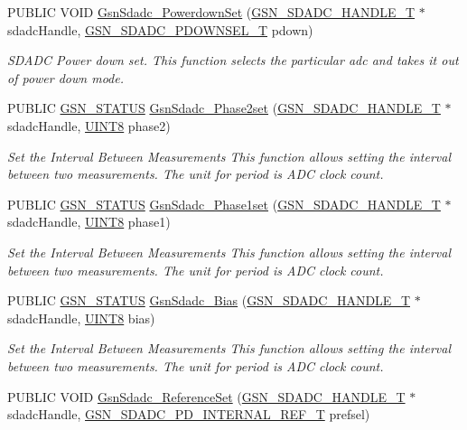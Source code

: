 \begin{DoxyCompactItemize}
PUBLIC VOID \hyperlink{a00652_ga8c97796c009f87dc85fea1d9903b5fe3}{GsnSdadc\_\-PowerdownSet} (\hyperlink{a00214}{GSN\_\-SDADC\_\-HANDLE\_\-T} $\ast$sdadcHandle, \hyperlink{a00652_gaa6002bca137b8b6b143379be96c9564b}{GSN\_\-SDADC\_\-PDOWNSEL\_\-T} pdown)
\begin{DoxyCompactList}\small\item\em SDADC Power down set. This function selects the particular adc and takes it out of power down mode. \end{DoxyCompactList}\item 
PUBLIC \hyperlink{a00660_gada5951904ac6110b1fa95e51a9ddc217}{GSN\_\-STATUS} \hyperlink{a00652_gab713a736854b758a0e5034cef7907731}{GsnSdadc\_\-Phase2set} (\hyperlink{a00214}{GSN\_\-SDADC\_\-HANDLE\_\-T} $\ast$sdadcHandle, \hyperlink{a00660_gab27e9918b538ce9d8ca692479b375b6a}{UINT8} phase2)
\begin{DoxyCompactList}\small\item\em Set the Interval Between Measurements This function allows setting the interval between two measurements. The unit for period is ADC clock count. \end{DoxyCompactList}\item 
PUBLIC \hyperlink{a00660_gada5951904ac6110b1fa95e51a9ddc217}{GSN\_\-STATUS} \hyperlink{a00652_gaf0a81b59531c9a725cdcc9349c2aa9a3}{GsnSdadc\_\-Phase1set} (\hyperlink{a00214}{GSN\_\-SDADC\_\-HANDLE\_\-T} $\ast$sdadcHandle, \hyperlink{a00660_gab27e9918b538ce9d8ca692479b375b6a}{UINT8} phase1)
\begin{DoxyCompactList}\small\item\em Set the Interval Between Measurements This function allows setting the interval between two measurements. The unit for period is ADC clock count. \end{DoxyCompactList}\item 
PUBLIC \hyperlink{a00660_gada5951904ac6110b1fa95e51a9ddc217}{GSN\_\-STATUS} \hyperlink{a00652_gac6eb69b9aca0daca189ca1438bc2b9c4}{GsnSdadc\_\-Bias} (\hyperlink{a00214}{GSN\_\-SDADC\_\-HANDLE\_\-T} $\ast$sdadcHandle, \hyperlink{a00660_gab27e9918b538ce9d8ca692479b375b6a}{UINT8} bias)
\begin{DoxyCompactList}\small\item\em Set the Interval Between Measurements This function allows setting the interval between two measurements. The unit for period is ADC clock count. \end{DoxyCompactList}\item 
PUBLIC VOID \hyperlink{a00652_gac1cd3f6636210580b969e4046ea65e9c}{GsnSdadc\_\-ReferenceSet} (\hyperlink{a00214}{GSN\_\-SDADC\_\-HANDLE\_\-T} $\ast$sdadcHandle, \hyperlink{a00652_ga05b970e216458c5062bbef89f323a2cf}{GSN\_\-SDADC\_\-PD\_\-INTERNAL\_\-REF\_\-T} prefsel)

\end{DoxyCompactItemize}
